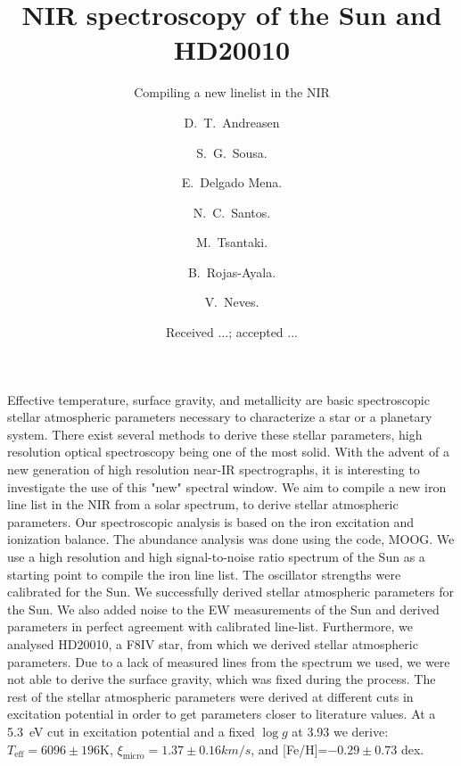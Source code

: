 \documentclass{aa}
\begin{document}
\title{NIR spectroscopy of the Sun and HD20010}
\subtitle{Compiling a new linelist in the NIR}


\author{ D.~T.~Andreasen
    \and S.~G.~Sousa.
    \and E.~Delgado Mena.
    \and N.~C.~Santos.
    \and M.~Tsantaki.
    \and B.~Rojas-Ayala.
    \and V.~Neves.}









\date{Received ...; accepted ...}

\abstract
{Effective temperature, surface gravity, and metallicity are basic
spectroscopic stellar atmospheric parameters necessary to characterize a
star or a planetary system. There exist several methods to derive these
stellar parameters, high resolution optical spectroscopy being one of
the most solid. With the advent of a new generation of high resolution
near-IR spectrographs, it is interesting to investigate the use of this
"new" spectral window.}
{We aim to compile a new iron line list in the NIR from a solar
spectrum, to derive stellar atmospheric parameters.}
{Our spectroscopic analysis is based on the iron excitation and
ionization balance. The abundance analysis was done using the code,
MOOG. We use a high resolution and high signal-to-noise ratio spectrum
of the Sun as a starting point to compile the iron line list. The
oscillator strengths were calibrated for the Sun.}
{We successfully derived stellar atmospheric parameters for the Sun.
We also added noise to the EW measurements of the Sun and derived
parameters in perfect agreement with calibrated line-list. Furthermore,
we analysed HD20010, a F8IV star, from which we derived stellar
atmospheric parameters. Due to a lack of measured  lines from the
spectrum we used, we were not able to derive the surface gravity, which
was fixed during the process. The rest of the stellar atmospheric
parameters were derived at different cuts in excitation potential in
order to get parameters closer to literature values. At a \SI{5.3}{eV}
cut in excitation potential and a fixed $\log g$ at 3.93 we derive:
$T_\mathrm{eff}=6096\pm196$K, $\xi_\mathrm{micro}=1.37\pm0.16\si{km/s}$,
and [Fe/H]=$-0.29\pm0.73$ dex.}
{}
\end{document}

